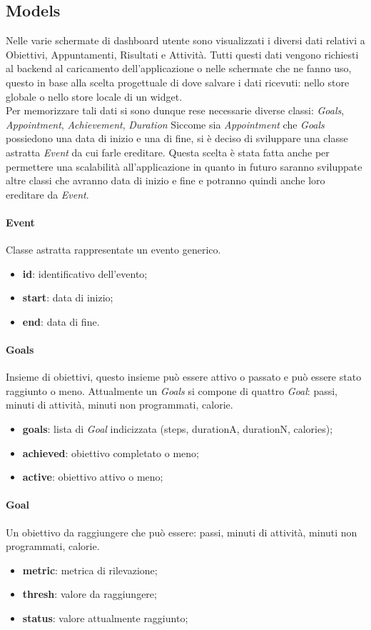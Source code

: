 \subsection{Models}
Nelle varie schermate di dashboard utente sono visualizzati i diversi dati relativi a Obiettivi, Appuntamenti, Risultati e Attività. Tutti questi dati vengono richiesti al backend al caricamento dell'applicazione o nelle schermate che ne fanno uso, questo in base alla scelta progettuale di dove salvare i dati ricevuti: nello store globale o nello store locale di un widget.\\
Per memorizzare tali dati si sono dunque rese necessarie diverse classi: \textit{Goals}, \textit{Appointment}, \textit{Achievement}, \textit{Duration}
Siccome sia \textit{Appointment} che \textit{Goals} possiedono una data di inizio e una di fine, si è deciso di sviluppare una classe astratta \textit{Event} da cui farle ereditare. Questa scelta è stata fatta anche per permettere una scalabilità all'applicazione in quanto in futuro saranno sviluppate altre classi che avranno data di inizio e fine e potranno quindi anche loro ereditare da \textit{Event}.
\paragraph{Event}
Classe astratta rappresentate un evento generico.
\begin{itemize}
    \item \textbf{id}: identificativo dell'evento;
    \item \textbf{start}: data di inizio;
    \item \textbf{end}: data di fine.
\end{itemize}
\paragraph{Goals}
Insieme di obiettivi, questo insieme può essere attivo o passato e può essere stato raggiunto o meno. Attualmente un \textit{Goals} si compone di quattro \textit{Goal}: passi, minuti di attività, minuti non programmati, calorie.
\begin{itemize}
    \item \textbf{goals}: lista di \textit{Goal} indicizzata (steps, durationA, durationN, calories);
    \item \textbf{achieved}: obiettivo completato o meno;
    \item \textbf{active}: obiettivo attivo o meno;
\end{itemize}
\paragraph{Goal}
Un obiettivo da raggiungere che può essere: passi, minuti di attività, minuti non programmati, calorie.
\begin{itemize}
    \item \textbf{metric}: metrica di rilevazione;
    \item \textbf{thresh}: valore da raggiungere;
    \item \textbf{status}: valore attualmente raggiunto;
\end{itemize}
